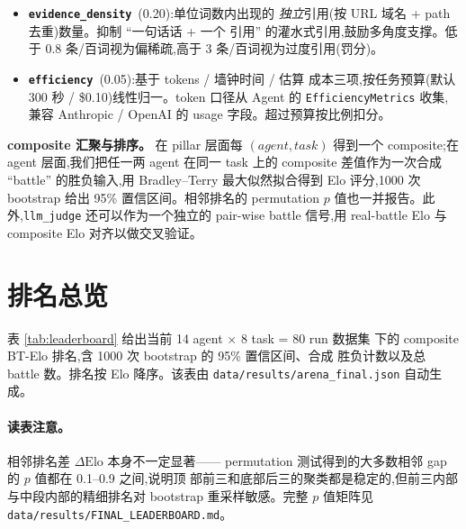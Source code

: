\documentclass[UTF8,11pt]{ctexart}
\begin{document}
\begin{itemize}[leftmargin=1.5em,itemsep=0.15em,topsep=0.2em]
    $k$ 个不同的产品”、“是否至少引用 $m$ 条不同的 reddit 帖子”、“是否显式
    标注价格区间”。每条由 Judge LLM 以 yes/no 回答,全答对为 15/15。实现在
    \texttt{src/verifiers/checklist\_verifier.py}。
  \item \textbf{\texttt{evidence\_density}}\ (0.20):单位词数内出现的
    \emph{独立}引用(按 URL 域名 + path 去重)数量。抑制 “一句话话 + 一个
    引用” 的灌水式引用,鼓励多角度支撑。低于 0.8 条/百词视为偏稀疏,高于 3
    条/百词视为过度引用(罚分)。
  \item \textbf{\texttt{efficiency}}\ (0.05):基于 tokens / 墙钟时间 / 估算
    成本三项,按任务预算(默认 300 秒 / \$0.10)线性归一。token 口径从
    Agent 的 \texttt{EfficiencyMetrics} 收集,兼容 Anthropic / OpenAI 的
    usage 字段。超过预算按比例扣分。
\end{itemize}

\textbf{composite 汇聚与排序。} 在 pillar 层面每 $(agent, task)$ 得到一个
composite;在 agent 层面,我们把任一两 agent 在同一 task 上的 composite
差值作为一次合成 “battle” 的胜负输入,用 Bradley--Terry 最大似然拟合得到
Elo 评分,1000 次 bootstrap 给出 95\% 置信区间。相邻排名的 permutation
$p$ 值也一并报告。此外,\texttt{llm\_judge} 还可以作为一个独立的 pair-wise
battle 信号,用 real-battle Elo 与 composite Elo 对齐以做交叉验证。

\section{排名总览}
\label{sec:leaderboard}

表 \ref{tab:leaderboard} 给出当前 14 agent $\times$ 8 task = 80 run 数据集
下的 composite BT-Elo 排名,含 1000 次 bootstrap 的 95\% 置信区间、合成
胜负计数以及总 battle 数。排名按 Elo 降序。该表由
\texttt{data/results/arena\_final.json} 自动生成。

\begin{table}[h]
  \centering
  \small
  
  \caption{Composite BT-Elo 排名(14 agents,80 runs,1000 bootstrap
    resamples)。\textbf{W/L/D} 按合成两两对战(每对 Agent 在同一任务上的
    composite 差值)统计,差值过小计平。含学术任务的 6 个 Agent 的 Battles
    列比其他 Agent 多,因为它们跨的任务集更大。}
  \label{tab:leaderboard}
\end{table}

\paragraph{读表注意。} 相邻排名差 $\Delta \text{Elo}$ 本身不一定显著——
permutation 测试得到的大多数相邻 gap 的 $p$ 值都在 0.1--0.9 之间,说明顶
部前三和底部后三的聚类都是稳定的,但前三内部与中段内部的精细排名对
bootstrap 重采样敏感。完整 $p$ 值矩阵见
\texttt{data/results/FINAL\_LEADERBOARD.md}。
\end{document}
